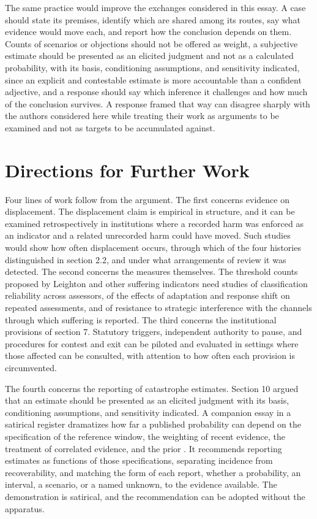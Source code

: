 \documentclass[11pt]{article}
\begin{document}
The same practice would improve the exchanges considered in this essay. A case should state its premises, identify which are shared among its routes, say what evidence would move each, and report how the conclusion depends on them. Counts of scenarios or objections should not be offered as weight, a subjective estimate should be presented as an elicited judgment and not as a calculated probability, with its basis, conditioning assumptions, and sensitivity indicated, since an explicit and contestable estimate is more accountable than a confident adjective, and a response should say which inference it challenges and how much of the conclusion survives. A response framed that way can disagree sharply with the authors considered here while treating their work as arguments to be examined and not as targets to be accumulated against.

\section{Directions for Further Work}

Four lines of work follow from the argument. The first concerns evidence on displacement. The displacement claim is empirical in structure, and it can be examined retrospectively in institutions where a recorded harm was enforced as an indicator and a related unrecorded harm could have moved. Such studies would show how often displacement occurs, through which of the four histories distinguished in section 2.2, and under what arrangements of review it was detected. The second concerns the measures themselves. The threshold counts proposed by Leighton and other suffering indicators need studies of classification reliability across assessors, of the effects of adaptation and response shift on repeated assessments, and of resistance to strategic interference with the channels through which suffering is reported. The third concerns the institutional provisions of section 7. Statutory triggers, independent authority to pause, and procedures for contest and exit can be piloted and evaluated in settings where those affected can be consulted, with attention to how often each provision is circumvented.

The fourth concerns the reporting of catastrophe estimates. Section 10 argued that an estimate should be presented as an elicited judgment with its basis, conditioning assumptions, and sensitivity indicated. A companion essay in a satirical register dramatizes how far a published probability can depend on the specification of the reference window, the weighting of recent evidence, the treatment of correlated evidence, and the prior \citep{flyxion2026}. It recommends reporting estimates as functions of those specifications, separating incidence from recoverability, and matching the form of each report, whether a probability, an interval, a scenario, or a named unknown, to the evidence available. The demonstration is satirical, and the recommendation can be adopted without the apparatus.
\end{document}
